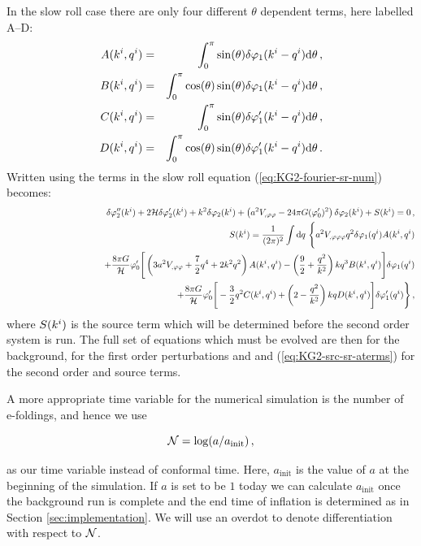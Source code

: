 In the slow roll case there are only four different $\theta$ dependent terms,
here labelled A--D:
%
\begin{eqnarray}
\label{eq:AtoD-num}
 A(k^i,q^i) &=& \int_0^\pi \sin(\theta) \delta\varphi_{1}(k^i-q^i) \mathrm{d}\theta \,,
\nonumber\\
 B(k^i,q^i) &=& \int_0^\pi \cos(\theta)\sin(\theta) \delta\varphi_{1}(k^i-q^i)
\mathrm{d}\theta \,,\nonumber\\
 C(k^i,q^i) &=& \int_0^\pi \sin(\theta) \delta\varphi_{1}'(k^i-q^i) \mathrm{d}\theta \,,
\nonumber\\
 D(k^i,q^i) &=& \int_0^\pi \cos(\theta) \sin(\theta) \delta\varphi_{1}'(k^i-q^i)
\mathrm{d}\theta \,.
\end{eqnarray}
%
Written using the terms in  the slow roll equation
(\ref{eq:KG2-fourier-sr-num}) becomes:
%
\begin{eqnarray}
\label{eq:KG2-fourier-sr-aterms}
&&\dvp2''(\kvi)+2\H\dvp2'(\kvi)+k^2\dvp2(\kvi)
+\left(a^2
\Upp-{24 \pi G}(\vp_{0}')^2\right)
\dvp2(\kvi)
+ S(\kvi) = 0 \,,\\
%
\label{eq:KG2-src-sr-aterms}
&&S(\kvi) = \frac{1}{(2\pi)^2}\int \d q\ \Bigg\{
a^2\Uppp q^2 \dvp1(\qvi) A(\kvi,\qvi) \nonumber\\
&& \qquad\qquad\qquad\qquad\qquad + \frac{8\pi G}{\H}\vp_{0}' \Bigg[ 
\left( 3a^2\Upp + \frac{7}{2}q^4 + 2k^2q^2\right) A(\kvi,\qvi)
-\left(\frac{9}{2} + \frac{q^2}{k^2}\right)kq^3 B(\kvi,\qvi)
\Bigg]\dvp1(\qvi) \nonumber\\
%
&&\qquad\qquad\qquad\qquad \qquad+ \frac{8\pi G}{\H}\vp_{0}' \Bigg[
-\frac{3}{2}q^2 C(\kvi,\qvi) + \left(2-\frac{q^2}{k^2}\right)kq D(\kvi,\qvi) 
\Bigg]\dvp1'(\qvi) \Bigg\} \,,
%
\end{eqnarray}
%
where $S(k^i)$ is the source term which will be determined before the
second order system is run. The full set of equations which must be evolved are
then  for the background,  for the first
order perturbations and  and
(\ref{eq:KG2-src-sr-aterms}) for the second order and source terms.


A more appropriate time variable for the numerical simulation is the
number of e-foldings, and hence we use 
%

\begin{equation}
\label{eq:def-ntime}
\mathcal{N} = \log ( a / a_{\mathrm{init}} )\,,
\end{equation}

%
as our time variable instead of conformal time. Here,
$a_{\mathrm{init}}$ is the value of $a$ at the beginning of the
simulation. If $a$ is set to be $1$ today we can calculate
$a_{\mathrm{init}}$ once the background run is complete and the end
time of inflation is determined as in Section
\ref{sec:implementation}. We will use an overdot to denote
differentiation with respect to $\mathcal{N}$.


